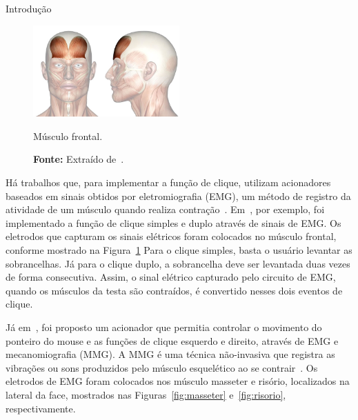 \begin{chapter}{Introdução}
\begin{figure}[!h]
	\centering
	\includegraphics[width=0.5\textwidth]{fig/frontal}
	\caption{Músculo frontal.}
	\vspace{-1.0cm}
	\caption*{\textbf{Fonte:} Extraído de~\cite{musculo}.}
	\label{fig:frontal}
\end{figure}

Há trabalhos que, para implementar a função de clique, utilizam acionadores
baseados em sinais obtidos por eletromiografia (EMG), um método de registro da
atividade de um músculo quando realiza contração~\cite{Amadio07}.
Em~\cite{Pinheiro12}, por exemplo, foi implementado a função de clique simples e
duplo através de sinais de EMG. Os eletrodos que capturam os sinais elétricos
foram colocados no músculo frontal, conforme mostrado na
Figura~\ref{fig:frontal} Para o clique simples, basta o usuário levantar as
sobrancelhas. Já para o clique duplo, a sobrancelha deve ser levantada duas
vezes de forma consecutiva. Assim, o sinal elétrico capturado pelo circuito de
EMG, quando os músculos da testa são contraídos, é convertido nesses dois
eventos de clique.
  
Já em~\cite{Kaushik12}, foi proposto um acionador que permitia controlar o
movimento do ponteiro do mouse e as funções de clique esquerdo e direito,
através de EMG e mecanomiografia (MMG). A MMG é uma técnica não-invasiva que
registra as vibrações ou sons produzidos pelo músculo esquelético ao se
contrair~\cite{Vaz99}. Os eletrodos de EMG foram colocados nos músculo masseter
e risório, localizados na lateral da face, mostrados nas
Figuras~\ref{fig:masseter} e~\ref{fig:risorio}, respectivamente. 




\end{chapter}
